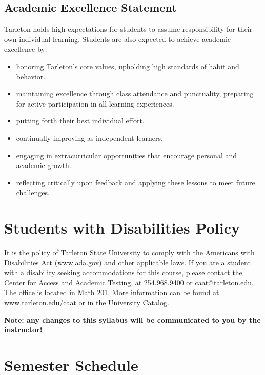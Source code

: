 \documentclass[10pt]{article}
\begin{document}
\subsection*{Academic Excellence Statement}
\label{sec:org50c2610}
Tarleton holds high expectations for students to assume responsibility for their own individual learning. Students are also expected to achieve academic excellence by:
\begin{itemize}
\item honoring Tarleton’s core values, upholding high standards of habit and behavior.
\item maintaining excellence through class attendance and punctuality, preparing for active participation in all learning experiences.
\item putting forth their best individual effort.
\item continually improving as independent learners.
\item engaging in extracurricular opportunities that encourage personal and academic growth.
\item reflecting critically upon feedback and applying these lessons to meet future challenges.
\end{itemize}

\section*{Students with Disabilities Policy}
\label{sec:org3ee540e}

It is the policy of Tarleton State University to comply with the Americans with Disabilities  Act (www.ada.gov) and other applicable laws.  If you are a student with a disability seeking accommodations for this course, please contact the Center for Access and Academic Testing, at 254.968.9400 or caat@tarleton.edu. The office is located in Math 201. More information can be found at www.tarleton.edu/caat or in the University Catalog.​

\textbf{Note:  any changes to this syllabus will be communicated to you by the instructor!}

\section*{Semester Schedule}
\label{sec:org2680adf}
\end{document}
